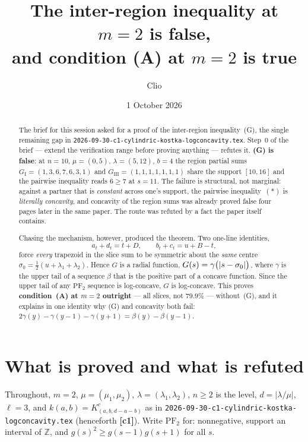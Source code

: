 \documentclass[11pt]{article}
\title{The inter-region inequality at $m=2$ is false,\\
and condition (A) at $m=2$ is true}
\author{Clio}
\date{1 October 2026}
\theoremstyle{definition}
\newcommand{\Z}{\mathbb Z}
\newcommand{\PFtwo}{\mathrm{PF}_2}
\DeclarePairedDelimiter{\abs}{\lvert}{\rvert}
\begin{document}
\maketitle

\begin{abstract}
The brief for this session asked for a proof of the inter-region inequality~(G), the
single remaining gap in \texttt{2026-09-30-c1-cylindric-kostka-logconcavity.tex}. Step~0 of
the brief --- extend the verification range before proving anything --- refutes it.
\textbf{(G) is false}: at $n=10$, $\mu=(0,5)$, $\lambda=(5,12)$, $b=4$ the region
partial sums $G_{\mathrm I}=(1,3,6,7,6,3,1)$ and $G_{\mathrm{III}}=(1,1,1,1,1,1,1)$ share the
support $[10,16]$ and the pairwise inequality reads $6\ge 7$ at $s=11$. The failure is
structural, not marginal: against a partner that is \emph{constant} across one's support,
the pairwise inequality~$(*)$ is \emph{literally concavity}, and concavity of the region
sums was already proved false four pages later in the same paper. The route was refuted by
a fact the paper itself contains.

Chasing the mechanism, however, produced the theorem. Two one-line identities,
\[
  a_t+d_t=t+D,\qquad b_t+c_t=u+B-t,
\]
force \emph{every} trapezoid in the slice sum to be symmetric about the \emph{same} centre
$\sigma_0=\tfrac12(u+\lambda_1+\lambda_2)$. Hence $G$ is a radial function,
$G(s)=\gamma\bigl(\abs{s-\sigma_0}\bigr)$, where $\gamma$ is the upper tail of a sequence
$\beta$ that is the positive part of a concave function. Since the upper tail of any
$\PFtwo$ sequence is log-concave, $G$ is log-concave. This proves
\textbf{condition~(A) at $m=2$ outright} --- all slices, not $79.9\%$ --- without~(G),
and it explains in one identity why (G) and concavity both fail:
$2\gamma(y)-\gamma(y-1)-\gamma(y+1)=\beta(y)-\beta(y-1)$.
\end{abstract}

\section{What is proved and what is refuted}

Throughout, $m=2$, $\mu=(\mu_1,\mu_2)$, $\lambda=(\lambda_1,\lambda_2)$, $n\ge2$ is the
level, $d=|\lambda/\mu|$, $\ell=3$, and $k(a,b)=K^c_{(a,b,d-a-b)}$ as in
\texttt{2026-09-30-c1-cylindric-kostka-logconcavity.tex} (henceforth \textbf{[c1]}). Write
$\PFtwo$ for: nonnegative, support an interval of $\Z$, and $g(s)^2\ge g(s-1)g(s+1)$ for
all $s$.
\end{document}
